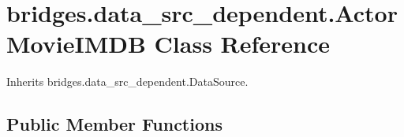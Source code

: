 \hypertarget{classbridges_1_1data__src__dependent_1_1_actor_movie_i_m_d_b}{}\section{bridges.\+data\+\_\+src\+\_\+dependent.\+Actor\+Movie\+I\+M\+DB Class Reference}
\label{classbridges_1_1data__src__dependent_1_1_actor_movie_i_m_d_b}


Inherits bridges.\+data\+\_\+src\+\_\+dependent.\+Data\+Source.

\subsection*{Public Member Functions}
